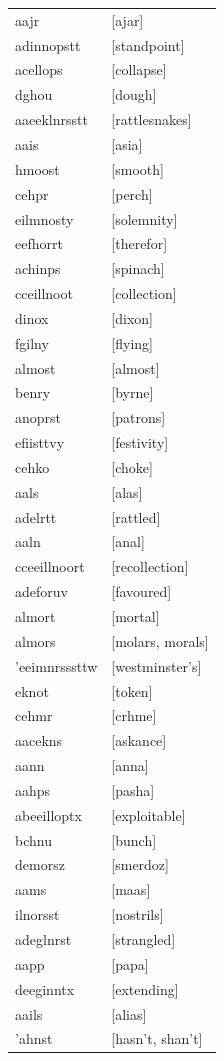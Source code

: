 \documentclass{article}
\begin{document}
\begin{tabular}{ll}
aajr & [ajar] \\
adinnopstt & [standpoint] \\
acellops & [collapse] \\
dghou & [dough] \\
aaeeklnrsstt & [rattlesnakes] \\
aais & [asia] \\
hmoost & [smooth] \\
cehpr & [perch] \\
eilmnosty & [solemnity] \\
eefhorrt & [therefor] \\
achinps & [spinach] \\
cceillnoot & [collection] \\
dinox & [dixon] \\
fgilny & [flying] \\
almost & [almost] \\
benry & [byrne] \\
anoprst & [patrons] \\
efiisttvy & [festivity] \\
cehko & [choke] \\
aals & [alas] \\
adelrtt & [rattled] \\
aaln & [anal] \\
cceeillnoort & [recollection] \\
adeforuv & [favoured] \\
almort & [mortal] \\
almors & [molars, morals] \\
'eeimnrsssttw & [westminster's] \\
eknot & [token] \\
cehmr & [crhme] \\
aacekns & [askance] \\
aann & [anna] \\
aahps & [pasha] \\
abeeilloptx & [exploitable] \\
bchnu & [bunch] \\
demorsz & [smerdoz] \\
aams & [maas] \\
ilnorsst & [nostrils] \\
adeglnrst & [strangled] \\
aapp & [papa] \\
deeginntx & [extending] \\
aails & [alias] \\
'ahnst & [hasn't, shan't] \\

\end{tabular}
\end{document}
